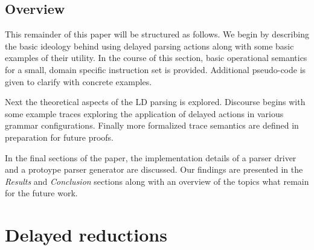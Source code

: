 \documentclass[a4paper,11pt]{article}
\begin{document}


\subsection{Overview}
This remainder of this paper will be structured as follows. 
We begin by describing the basic ideology behind using delayed parsing actions along with some basic examples of their utility.
In the course of this section, basic operational semantics for a small, domain specific instruction set is provided.
Additional pseudo-code is given to clarify with concrete examples.

Next the theoretical aspects of the LD parsing is explored.
Discourse begins with some example traces exploring the application of delayed actions in various grammar configurations. 
Finally more formalized trace semantics are defined in preparation for future proofs.

In the final sections of the paper, the implementation details of a parser driver and a protoype parser generator are discussed.
Our findings are presented in the \emph{Results} and \emph{Conclusion} sections along with an overview of the topics what remain for the future work.

\section{Delayed reductions}
\end{document}
